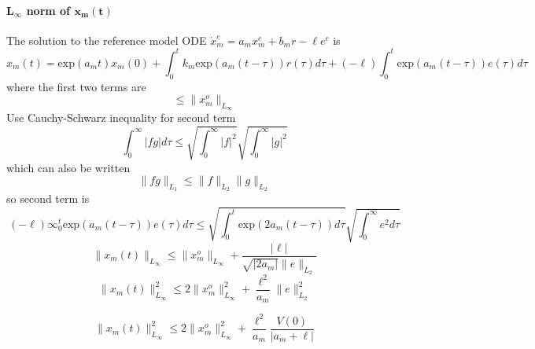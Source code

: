 \paragraph{$\boldsymbol{L_{\infty}}$ norm of $\boldsymbol{x_{m}(t)}$}
The solution to the reference model ODE $\dot{x}_{m}^{c}=a_{m}x_{m}^{c}+b_{m}r-\ell e^{c}$ is
\begin{equation*}
  x_{m}(t)=\text{exp}(a_{m}t)x_{m}(0)+\int_{0}^{t}k_{m}\text{exp}(a_{m}(t-\tau))r(\tau)d\tau+(-\ell)\int_{0}^{t}\text{exp}(a_{m}(t-\tau))e(\tau)d\tau
\end{equation*}
where the first two terms are
\begin{equation*}
  \leq\|x_{m}^{o}\|_{L_{\infty}}
\end{equation*}
Use Cauchy-Schwarz inequality for second term
\begin{equation*}
  \int_{0}^{\infty}|fg|d\tau\leq\sqrt{\int_{0}^{\infty}|f|^{2}}\sqrt{\int_{0}^{\infty}|g|^{2}}
\end{equation*}
which can also be written
\begin{equation*}
  \|fg\|_{L_{1}}\leq\|f\|_{L_{2}}\|g\|_{L_{2}}
\end{equation*}
so second term is
\begin{equation*}
  (-\ell)\infty_{0}^{t}\text{exp}(a_{m}(t-\tau))e(\tau)d\tau\leq\sqrt{\int_{0}^{t}\text{exp}(2a_{m}(t-\tau))d\tau}\sqrt{\int_{0}^{\infty}e^{2}d\tau}
\end{equation*}
\begin{equation*}
  \|x_{m}(t)\|_{L_{\infty}}\leq\|x_{m}^{o}\|_{L_{\infty}}+\frac{|\ell|}{\sqrt{|2a_{m}|}\|e\|_{L_{2}}}
\end{equation*}
\begin{equation*}
  \|x_{m}(t)\|_{L_{\infty}}^{2}\leq2\|x_{m}^{o}\|^{2}_{L_{\infty}}+\frac{\ell^{2}}{a_{m}}\|e\|_{L_{2}}^{2}
\end{equation*}

\begin{equation*}
  \|x_{m}(t)\|_{L_{\infty}}^{2}\leq2\|x_{m}^{o}\|^{2}_{L_{\infty}}+\frac{\ell^{2}}{a_{m}}\frac{V(0)}{|a_{m}+\ell|}
\end{equation*}

